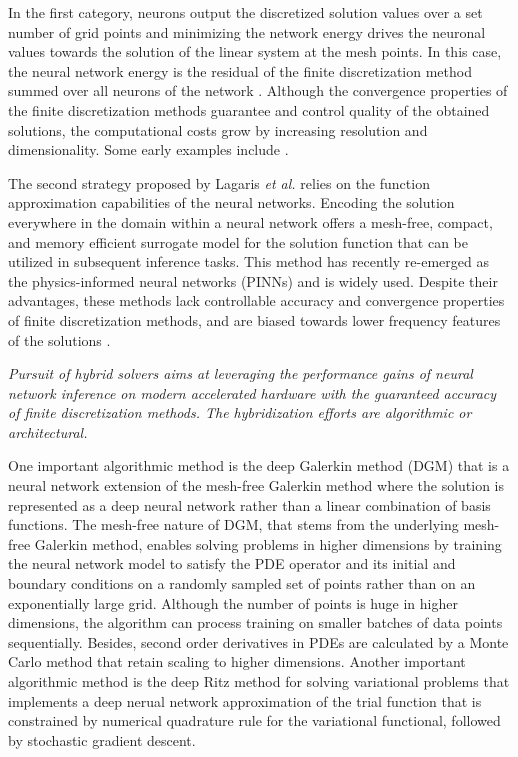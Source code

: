 \documentclass{article}
\begin{document}
In the first category, neurons output the discretized solution values over a set number of grid points and minimizing the network energy drives the neuronal values towards the solution of the linear system at the mesh points. In this case, the neural network energy is the residual of the finite discretization method summed over all neurons of the network \cite{lee1990neural}. Although the convergence properties of the finite discretization methods guarantee and control quality of the obtained solutions, the computational costs grow by increasing resolution and dimensionality. Some early examples include \cite{gobovic1993design,chua1988cellular,chua1988cellularA}.


The second strategy proposed by Lagaris \textit{et al.} \cite{lagaris1998artificial} relies on the function approximation capabilities of the neural networks. Encoding the solution everywhere in the domain within a neural network offers a mesh-free, compact, and memory efficient surrogate model for the solution function that can be utilized in subsequent inference tasks. This method has recently re-emerged as the physics-informed neural networks (PINNs) \cite{RAISSI2019686} and is widely used. Despite their advantages, these methods lack controllable accuracy and convergence properties of finite discretization methods, and are biased towards lower frequency features of the solutions \cite{wang2022and,rahaman2019spectral}.

\textit{Pursuit of hybrid solvers aims at leveraging the performance gains of neural network inference on modern accelerated hardware with the guaranteed accuracy of finite discretization methods. The hybridization efforts are algorithmic or architectural.}

One important algorithmic method is the deep Galerkin method (DGM) \cite{SIRIGNANO20181339} that is a neural network extension of the mesh-free Galerkin method where the solution is represented as a deep neural network rather than a linear combination of basis functions. The mesh-free nature of DGM, that stems from the underlying mesh-free Galerkin method, enables solving problems in higher dimensions by training the neural network model to satisfy the PDE operator and its initial and boundary conditions on a randomly sampled set of points rather than on an exponentially large grid. Although the number of points is huge in higher dimensions, the algorithm can process training on smaller batches of data points sequentially. Besides, second order derivatives in PDEs are calculated by a Monte Carlo method that retain scaling to higher dimensions. Another important algorithmic method is the deep Ritz method for solving variational problems \cite{yu2018deep} that implements a deep nerual network approximation of the trial function that is constrained by numerical quadrature rule for the variational functional, followed by stochastic gradient descent.
\end{document}
